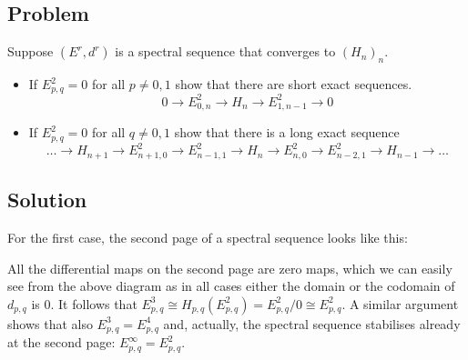 \documentclass{article}
\begin{document}
\subsection*{Problem}
Suppose $(E^r,d^r)$ is a spectral sequence that converges to $(H_n)_n$.
\begin{itemize}
\item If $E^2_{p,q} = 0$ for all $p \neq 0,1$ show that there are short exact sequences.
\begin{equation*}
0 \to E^2_{0,n} \to H_n \to E^2_{1,n-1} \to 0
\end{equation*}
\item If $E^2_{p,q} = 0$ for all $q \neq 0,1$ show that there is a long exact sequence
\begin{equation*}
\dots \to H_{n+1} \to E^2_{n+1,0} \to E^2_{n-1,1} \to H_n \to E^2_{n,0} \to E^2_{n-2,1} \to H_{n-1} \to \dots
\end{equation*}
\end{itemize}
\subsection*{Solution}
For the first case, the second page of a spectral sequence looks like this:

\begin{center}\end{center}

All the differential maps on the second page are zero maps, which we can easily see from the above diagram as in all cases either the domain or the codomain of $d_{p,q}$ is $0$. It follows that $E^3_{p,q} \cong H_{p,q}(E^2_{p,q}) = E^2_{p,q}/0 \cong E^2_{p,q}$. A similar argument shows that also $E^3_{p,q} = E^4_{p,q}$ and, actually, the spectral sequence stabilises already at the second page: $E^\infty_{p,q} = E^2_{p,q}$.
\end{document}
